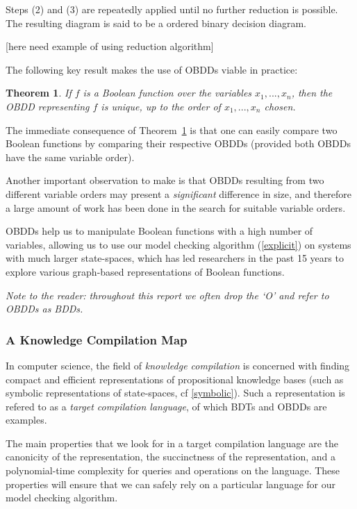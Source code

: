 \documentclass[12]{article}
\newtheorem{theorem}{Theorem}[section]
\begin{document}
Steps (2) and (3) are repeatedly applied until no further reduction is possible. The resulting diagram is said to be a ordered binary decision diagram. 

[here need example of using reduction algorithm]

The following key result makes the use of OBDDs viable in practice: 

\begin{theorem}
\label{obdd_uniqueness}
If $f$ is a Boolean function over the variables $x_1, ..., x_n$, then the OBDD representing $f$ is unique, up to the order of $x_1, ..., x_n$ chosen.
\end{theorem}

The immediate consequence of Theorem~\ref{obdd_uniqueness} is that one can easily compare two Boolean functions by comparing their respective OBDDs (provided both OBDDs have the same variable order). 

Another important observation to make is that OBDDs resulting from two different variable orders may present a \textit{significant }difference in size, and therefore a large amount of work has been done in the search for suitable variable orders. 

OBDDs help us to manipulate Boolean functions with a high number of variables, allowing us to use our model checking algorithm (\ref{explicit}) on systems with much larger state-spaces, which has led researchers in the past 15 years to explore various graph-based representations of Boolean functions.

\noindent\textit{Note to the reader: throughout this report we often drop the `O' and refer to OBDDs as BDDs.}

\subsubsection{A Knowledge Compilation Map}

In computer science, the field of \textit{knowledge compilation} is concerned with finding compact and efficient representations of propositional knowledge bases (such as symbolic representations of state-spaces, cf \ref{symbolic}).
 Such a representation is refered to as a \textit{target compilation language}, of which BDTs and OBDDs are examples. 
 
 The main properties that we look for in a target compilation language are the canonicity of the representation, the succinctness of the representation, and a polynomial-time complexity for queries and operations on the language. 
 These properties will ensure that we can safely rely on a particular language for our model checking algorithm. 
 
\end{document}
